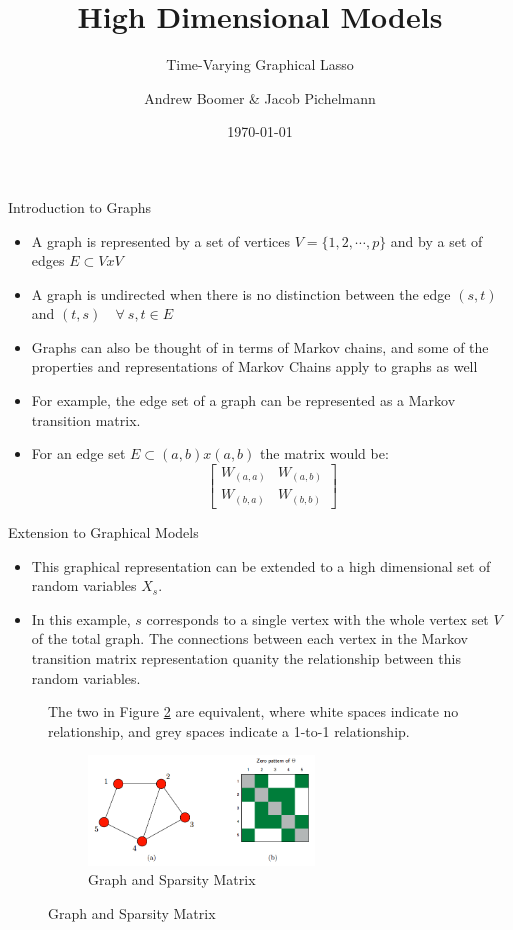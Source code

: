 \documentclass{beamer}
\title[High Dimensional Models] %
{High Dimensional Models}
\subtitle{Time-Varying Graphical Lasso}
\author[Andrew Boomer \& Jacob Pichelmann] %
{Andrew Boomer \& Jacob Pichelmann}
\institute []
{Toulouse School of Economics \\ M2 EEE}
\date{\today}
\begin{document}
\frame{\titlepage}
    
\begin{frame}{Introduction to Graphs}
    \begin{itemize}
        \item A graph is represented by a set of vertices $V = \{1, 2, \dotsb, p\}$ and by a set of edges $E \subset V x V$
        \item A graph is undirected when there is no distinction between the edge $(s, t)$ and $(t, s) \quad \forall \ s, t \in E$
        \item Graphs can also be thought of in terms of Markov chains, and some of the properties and representations of Markov Chains apply to graphs as well
        \item For example, the edge set of a graph can be represented as a Markov transition matrix.
        \item For an edge set $E \subset (a, b) x (a, b)$ the matrix would be:
        \[\begin{bmatrix} W_{(a, a)} & W_{(a, b)} \\
           W_{(b, a)} & W_{(b, b)} \end{bmatrix}\]
    \end{itemize}
\end{frame}

\begin{frame}{Extension to Graphical Models}
  \begin{itemize}
    \item This graphical representation can be extended to a high dimensional set of random variables $X_{s}$.
    \item In this example, $s$ corresponds to a single vertex with the whole vertex set $V$ of the total graph. The connections between each vertex in the Markov transition matrix representation quanity the relationship between this random variables.
  \end{itemize}
  \begin{figure}
  \begin{minipage}{0.4\textwidth}
      The two in Figure \ref{fig:IntroPic} are equivalent, where white spaces indicate no relationship, and grey spaces indicate a 1-to-1 relationship.
  \end{minipage}%
  \begin{minipage}{0.6\textwidth}
    \begin{figure}
       \includegraphics[width=6cm]{IntroGraphMat.png}
       \caption{Graph and Sparsity Matrix}
       \label{fig:IntroPic}
  \end{figure} 
  \end{minipage}
  \end{figure}
\end{frame}
\end{document}
